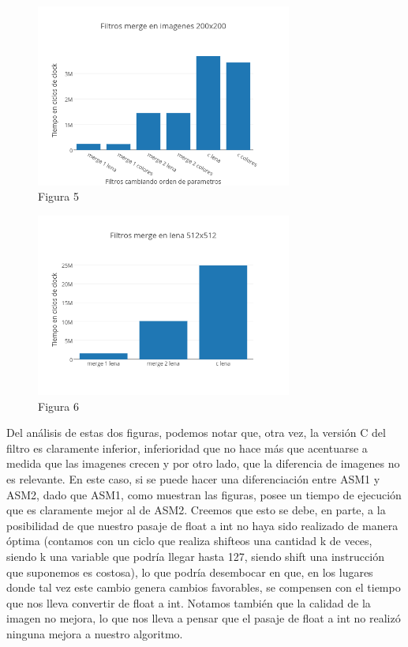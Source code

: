 \documentclass[a4paper]{article}
\begin{document}
\begin{figure}[h]
  \centering
    \includegraphics[width=0.75\textwidth]{imagenes/Filtros merge en imagenes 200x200.png}
  \caption{Figura 5}
  \label{fig:graficomerge1}
\end{figure}
 \FloatBarrier



\begin{figure}[h]
  \centering
    \includegraphics[width=0.75\textwidth]{imagenes/Filtros merge en lena 512x512.png}
  \caption{Figura 6}
  \label{fig:graficomerge2}
\end{figure}
 \FloatBarrier

Del análisis de estas dos figuras, podemos notar que, otra vez, la versión C del filtro es claramente inferior, inferioridad que no hace más que acentuarse a medida que las imagenes crecen y por otro lado, que la diferencia de imagenes no es relevante. En este caso, si se puede hacer una diferenciación entre ASM1 y ASM2, dado que ASM1, como muestran las figuras, posee un tiempo de ejecución que es claramente mejor al de ASM2. Creemos que esto se debe, en parte, a la posibilidad de que nuestro pasaje de float a int no haya sido realizado de manera óptima (contamos con un ciclo que realiza shifteos una cantidad k de veces, siendo k una variable que podría llegar hasta 127, siendo shift una instrucción que suponemos es costosa), lo que podría desembocar en que, en los lugares donde tal vez este cambio genera cambios favorables, se compensen con el tiempo que nos lleva convertir de float a int.	Notamos también que la calidad de la imagen no mejora, lo que nos lleva a pensar que el pasaje de float a int no realizó ninguna mejora a nuestro algoritmo. 
\end{document}
